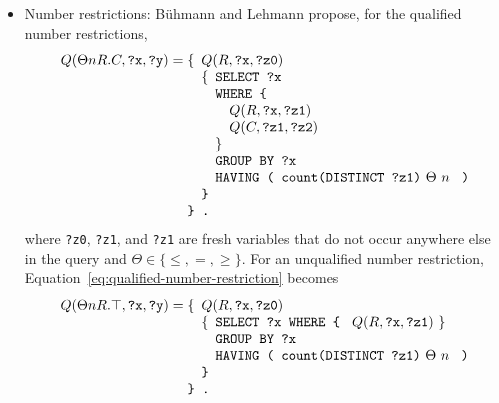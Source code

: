 \documentclass[a4paper]{article}
\newcounter{ex}
\begin{document}
\begin{itemize}
\item Number restrictions:
  B\"uhmann and Lehmann propose, for the qualified number restrictions,
  \begin{equation}\label{eq:qualified-number-restriction}
    Q(\Theta nR.C, \mbox{\tt ?x}, \mbox{\tt ?y}) =
    \begin{minipage}[t]{5in}
      \begin{tabbing}
        \quad\=\quad\=\quad\=\kill
        \{\>$Q(R, \mbox{\tt ?x}, \mbox{\tt ?z0})$\\
        \>\{\>\texttt{SELECT ?x}\\
        \>\>\texttt{WHERE \{}\\
        \>\>\>$Q(R, \mbox{\tt ?x}, \mbox{\tt ?z1})$\\
        \>\>\>$Q(C, \mbox{\tt ?z1}, \mbox{\tt ?z2})$\\
        \>\>\}\\
        \>\>\texttt{GROUP BY ?x}\\
        \>\>\texttt{HAVING ( count(DISTINCT ?z1)} $\Theta$ $n$ \texttt{\ )}\\
        \>\texttt{\}}\\
        \texttt{\} .}
      \end{tabbing}
    \end{minipage}
  \end{equation}
  where \texttt{?z0}, \texttt{?z1}, and \texttt{?z1} are fresh variables
  that do not occur anywhere else in the query and $\Theta \in \{ \leq, =, \geq \}$.
  For an unqualified number restriction, Equation~\ref{eq:qualified-number-restriction} becomes
  \begin{equation}\label{eq:unqualified-number-restriction}
    Q(\Theta nR.\top, \mbox{\tt ?x}, \mbox{\tt ?y}) =
    \begin{minipage}[t]{5in}
      \begin{tabbing}
        \quad\=\quad\=\quad\=\kill
        \{\>$Q(R, \mbox{\tt ?x}, \mbox{\tt ?z0})$\\
        \>\{\>\texttt{SELECT ?x WHERE \{ } $Q(R, \mbox{\tt ?x}, \mbox{\tt ?z1})$ \}\\
        \>\>\texttt{GROUP BY ?x}\\
        \>\>\texttt{HAVING ( count(DISTINCT ?z1)} $\Theta$ $n$ \texttt{\ )}\\
        \>\texttt{\}}\\
        \texttt{\} .}
      \end{tabbing}
    \end{minipage}
  \end{equation}

\end{itemize}
\end{document}
